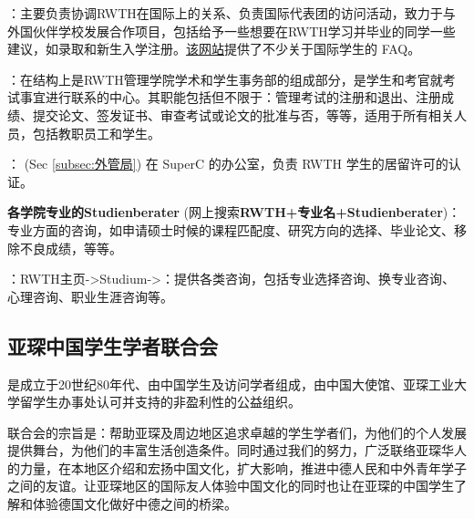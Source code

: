     \href{https://www.rwth-aachen.de/go/id/pvd/lidx/1}{}：主要负责协调RWTH在国际上的关系、负责国际代表团的访问活动，致力于与外国伙伴学校发展合作项目，包括给予一些想要在RWTH学习并毕业的同学一些建议，如录取和新生入学注册。\href{https://linktr.ee/rwthinternationaloffice}{该网站}提供了不少关于国际学生的 FAQ。

    \href{https://www.rwth-aachen.de/cms/root/Die-RWTH/Einrichtungen/Verwaltung/Dezernate/Akademische-und-studentische-Angelegenhe/~rcv/Abteilung-1-3-Zentrales-Pruefungsamt/}{}：在结构上是RWTH管理学院学术和学生事务部的组成部分，是学生和考官就考试事宜进行联系的中心。其职能包括但不限于：管理考试的注册和退出、注册成绩、提交论文、签发证书、审查考试或论文的批准与否，等等，适用于所有相关人员，包括教职员工和学生。

    \href{https://www.rwth-aachen.de/cms/root/studium/Vor-dem-Studium/Internationale-Studierende/Organisation-des-Studienaufenthaltes/Visum-Aufenthaltsrecht/~bpte/Aufenthaltserlaubnis/}{}：  (Sec \ref{subsec:外管局}) 在 SuperC 的办公室，负责 RWTH 学生的居留许可的认证。

    \textbf{各学院专业的Studienberater} (网上搜索\textbf{RWTH+专业名+Studienberater})：专业方面的咨询，如申请硕士时候的课程匹配度、研究方向的选择、毕业论文、移除不良成绩，等等。

    ：RWTH主页->Studium->\href{https://www.rwth-aachen.de/cms/root/Studium/~hzvj/Beratung-Hilfe/}{}：提供各类咨询，包括专业选择咨询、换专业咨询、心理咨询、职业生涯咨询等。

  \subsection{亚琛中国学生学者联合会}\label{subsec:亚琛中国学生学者联合会}

    \href{http://www.vcwsa.rwth-aachen.de/}{}是成立于20世纪80年代、由中国学生及访问学者组成，由中国大使馆、亚琛工业大学留学生办事处认可并支持的非盈利性的公益组织。

    联合会的宗旨是：帮助亚琛及周边地区追求卓越的学生学者们，为他们的个人发展提供舞台，为他们的丰富生活创造条件。同时通过我们的努力，广泛联络亚琛华人的力量，在本地区介绍和宏扬中国文化，扩大影响，推进中德人民和中外青年学子之间的友谊。让亚琛地区的国际友人体验中国文化的同时也让在亚琛的中国学生了解和体验德国文化做好中德之间的桥梁。

